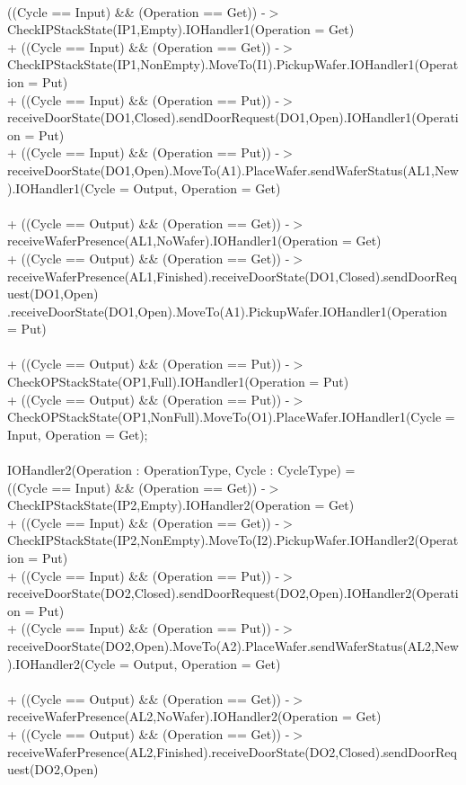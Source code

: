 \documentclass[a4paper,12pt]{article}
\begin{document}
\\((Cycle == Input) \&\& (Operation == Get)) -$>$ CheckIPStackState(IP1,Empty).IOHandler1(Operation = Get)
\\+ ((Cycle == Input) \&\& (Operation == Get)) -$>$ CheckIPStackState(IP1,NonEmpty).MoveTo(I1).PickupWafer.IOHandler1(Operation = Put)
\\+ ((Cycle == Input) \&\& (Operation == Put)) -$>$ receiveDoorState(DO1,Closed).sendDoorRequest(DO1,Open).IOHandler1(Operation = Put)
\\+ ((Cycle == Input) \&\& (Operation == Put)) -$>$ receiveDoorState(DO1,Open).MoveTo(A1).PlaceWafer.sendWaferStatus(AL1,New).IOHandler1(Cycle = Output, Operation = Get)
\\
\\+ ((Cycle == Output) \&\& (Operation == Get)) -$>$ receiveWaferPresence(AL1,NoWafer).IOHandler1(Operation = Get)
\\+ ((Cycle == Output) \&\& (Operation == Get)) -$>$ receiveWaferPresence(AL1,Finished).receiveDoorState(DO1,Closed).sendDoorRequest(DO1,Open)
.receiveDoorState(DO1,Open).MoveTo(A1).PickupWafer.IOHandler1(Operation = Put)
\\
\\+ ((Cycle == Output) \&\& (Operation == Put)) -$>$ CheckOPStackState(OP1,Full).IOHandler1(Operation = Put)
\\+ ((Cycle == Output) \&\& (Operation == Put)) -$>$ CheckOPStackState(OP1,NonFull).MoveTo(O1).PlaceWafer.IOHandler1(Cycle = Input, Operation = Get);
\\
\\IOHandler2(Operation : OperationType, Cycle : CycleType) =
\\((Cycle == Input) \&\& (Operation == Get)) -$>$ CheckIPStackState(IP2,Empty).IOHandler2(Operation = Get)
\\+ ((Cycle == Input) \&\& (Operation == Get)) -$>$ CheckIPStackState(IP2,NonEmpty).MoveTo(I2).PickupWafer.IOHandler2(Operation = Put)
\\+ ((Cycle == Input) \&\& (Operation == Put)) -$>$ receiveDoorState(DO2,Closed).sendDoorRequest(DO2,Open).IOHandler2(Operation = Put)
\\+ ((Cycle == Input) \&\& (Operation == Put)) -$>$ receiveDoorState(DO2,Open).MoveTo(A2).PlaceWafer.sendWaferStatus(AL2,New).IOHandler2(Cycle = Output, Operation = Get)
\\
\\+ ((Cycle == Output) \&\& (Operation == Get)) -$>$ receiveWaferPresence(AL2,NoWafer).IOHandler2(Operation = Get)
\\+ ((Cycle == Output) \&\& (Operation == Get)) -$>$ receiveWaferPresence(AL2,Finished).receiveDoorState(DO2,Closed).sendDoorRequest(DO2,Open)
\end{document}
